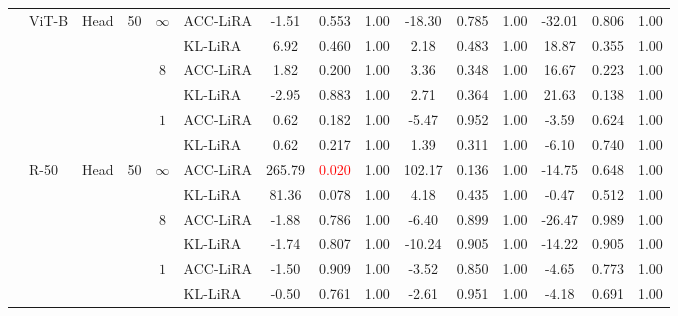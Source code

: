 \begin{table*}[htb]
\begin{center}
{\begin{tabular}{lllrclccccccccc}
 &  \multirow{6}{*}{ViT-B} & \multirow{6}{*}{Head} & \multirow{6}{*}{50} & \multirow{2}{*}{$\infty$} & ACC-LiRA & -1.51 & 0.553 & 1.00 & -18.30 & 0.785 & 1.00 & -32.01 & 0.806 & 1.00 \\
 &  &  &  & & KL-LiRA & 6.92 & 0.460 & 1.00 & 2.18 & 0.483 & 1.00 & 18.87 & 0.355 & 1.00 \\
\cmidrule{5-15}
 &  &  &  & \multirow{2}{*}{$8$} & ACC-LiRA & 1.82 & 0.200 & 1.00& 3.36 & 0.348 & 1.00 & 16.67 & 0.223 & 1.00\\
 &  &  &  &  & KL-LiRA & -2.95 & 0.883 & 1.00 & 2.71 & 0.364 & 1.00 & 21.63 & 0.138 & 1.00\\
\cmidrule{5-15}
 &  &  &  & \multirow{2}{*}{$1$} & ACC-LiRA & 0.62 & 0.182 & 1.00& -5.47 & 0.952 & 1.00 & -3.59 & 0.624 & 1.00 \\
 &  &  & &  & KL-LiRA & 0.62 & 0.217 & 1.00& 1.39 & 0.311 & 1.00 & -6.10 & 0.740 & 1.00 \\

\cmidrule{2-15}
 & \multirow{6}{*}{R-50} & \multirow{6}{*}{Head} & \multirow{6}{*}{50} & \multirow{2}{*}{$\infty$} & ACC-LiRA & 265.79 & \textcolor{red}{0.020} & 1.00& 102.17 & 0.136 & 1.00& -14.75 & 0.648 & 1.00 \\
 &  &  &  & & KL-LiRA & 81.36 & 0.078 & 1.00& 4.18 & 0.435 & 1.00 & -0.47 & 0.512 & 1.00 \\
\cmidrule{5-15}
 &  &  &  & \multirow{2}{*}{$8$} & ACC-LiRA & -1.88 & 0.786 & 1.00 & -6.40 & 0.899 & 1.00 & -26.47 & 0.989 & 1.00 \\
 &  &  &  &  & KL-LiRA & -1.74 & 0.807 & 1.00 & -10.24 & 0.905 & 1.00 & -14.22 & 0.905 & 1.00 \\
\cmidrule{5-15}
 &  &  &  & \multirow{2}{*}{$1$} & ACC-LiRA & -1.50 & 0.909 & 1.00 & -3.52 & 0.850 & 1.00 & -4.65 & 0.773 & 1.00 \\
 &  &  &  &  & KL-LiRA & -0.50 & 0.761 & 1.00 & -2.61 & 0.951 & 1.00 & -4.18 & 0.691 & 1.00 \\


\end{tabular}}
\end{center}
\end{table*}
